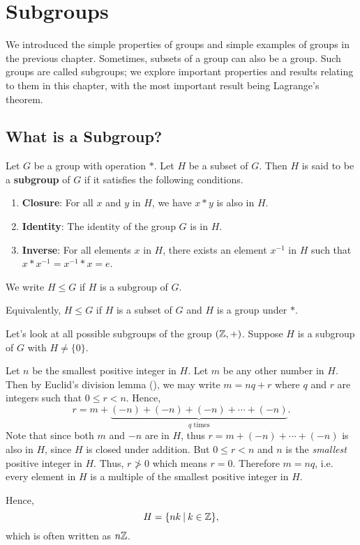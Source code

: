 \chapter{Subgroups}
We introduced the simple properties of groups and simple examples of groups in the previous chapter. Sometimes, subsets of a group can also be a group. Such groups are called subgroups; we explore important properties and results relating to them in this chapter, with the most important result being Lagrange's theorem.

\section{What is a Subgroup?}
\begin{definition}
    Let $G$ be a group with operation $\ast$. Let $H$ be a subset of $G$. Then $H$ is said to be a \textbf{subgroup} of $G$ if it satisfies the following conditions.
    \begin{enumerate}
        \item \textbf{Closure}: For all $x$ and $y$ in $H$, we have $x \ast y$ is also in $H$.
        \item \textbf{Identity}: The identity of the group $G$ is in $H$.
        \item \textbf{Inverse}: For all elements $x$ in $H$, there exists an element $x^{-1}$ in $H$ such that $x \ast x^{-1} = x^{-1} \ast x = e$.
    \end{enumerate}
    We write $H \leq G$ if $H$ is a subgroup of $G$.
\end{definition}
\begin{remark}
    Equivalently, $H \leq G$ if $H$ is a subset of $G$ and $H$ is a group under $\ast$.
\end{remark}

\begin{example}\label{example-subgroups-of-Z}
    Let's look at all possible subgroups of the group $(\mathbb{Z}, +)$. Suppose $H$ is a subgroup of $G$ with $H \neq \{0\}$.

    Let $n$ be the smallest positive integer in $H$. Let $m$ be any other number in $H$. Then by Euclid's division lemma (), we may write $m = nq + r$ where $q$ and $r$ are integers such that $0 \leq r < n$. Hence,
    \[
        r = m + \underbrace{(-n) +(-n) +(-n) + \cdots + (-n)}_{q\text{ times}}.
    \]
    Note that since both $m$ and $-n$ are in $H$, thus $r = m + (-n) + \cdots + (-n)$ is also in $H$, since $H$ is closed under addition. But $0 \leq r < n$ and $n$ is the \textit{smallest} positive integer in $H$. Thus, $r \not> 0$ which means $r = 0$. Therefore $m = nq$, i.e. every element in $H$ is a multiple of the smallest positive integer in $H$.

    Hence,
    \[
        H = \{nk \vert k \in \Z\},
    \]
    which is often written as $n\mathbb{Z}$.
\end{example}

